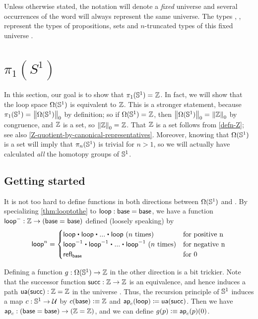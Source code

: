Unless otherwise stated, the notation \type will denote a
\emph{fixed} universe and several occurrences of the word \type will
always represent the same universe. The types \prop, \set, 
represent the types of propositions, sets and $n$-truncated types of
this fixed universe \type.

\section{\texorpdfstring{$\pi_1(S^1)$}{π₁(S¹)}}
\label{sec:pi1-s1-intro}

In this section, our goal is to show that $\id {\pi_1(\Sn ^1)} {\Z}$.
In fact, we will show that the loop space ${\Omega(\Sn ^1)}$ is equivalent to $\Z$.
This is a stronger statement, because $\id{\pi_1(\Sn ^1)} {\trunc 0 {\Omega(\Sn ^1)}}$ by
definition; so if $\id {\Omega(\Sn ^1)} {\Z}$, then $\id {\trunc
  0 {\Omega(\Sn ^1)}} {\trunc 0 {\Z}}$ by congruence, and
$\Z$ is a set, so $\id {\trunc 0 {\Z}} {\Z}$.
That $\Z$ is a set follows from \autoref{defn-Z}; see also \autoref{Z-quotient-by-canonical-representatives}.
Moreover, knowing that ${\Omega(\Sn ^1)}$ is a set will imply that $\pi_n(\Sn^1)$ is trivial for $n>1$, so we will actually have calculated \emph{all} the homotopy groups of $\Sn^1$.

\subsection{Getting started}
\label{sec:pi1s1-initial-thoughts}

It is not too hard to define functions in both directions between $\Omega(\Sn^1)$ and \Z.
By specializing \autoref{thm:looptothe} to $\lloop:\base=\base$, we have a function $\lloop^- : \Z \rightarrow (\id{\base}{\base})$ defined (loosely speaking) by
\[
\lloop^n = \begin{cases} \lloop \ct \lloop \ct ... \ct \lloop \text{ ($n$ times) } & \text{for positive n} \\
 \opp \lloop \ct \opp \lloop \ct ... \ct \opp \lloop \text{ ($n$ times)} & \text{for negative n} \\
  \refl{\base} & \text{for 0}  
\end{cases}
\]

Defining a function $g:\Omega(\Sn^1)\to\Z$ in the other direction is a bit trickier.
Note that the successor function $\Zsuc:\Z\to\Z$ is an equivalence, and hence induces a path $\ua(\Zsuc):\Z=\Z$ in the universe \type.
Thus, the recursion principle of $\Sn^1$ induces a map $c:\Sn^1\to\type$ by $c(\base)\defeq \Z$ and $\apfunc c (\lloop) \defid \ua(\Zsuc)$.
Then we have $\apfunc{c} : (\base=\base) \to (\Z=\Z)$, and we can define $g(p)\defeq \apfunc{c}(p)(0)$.

